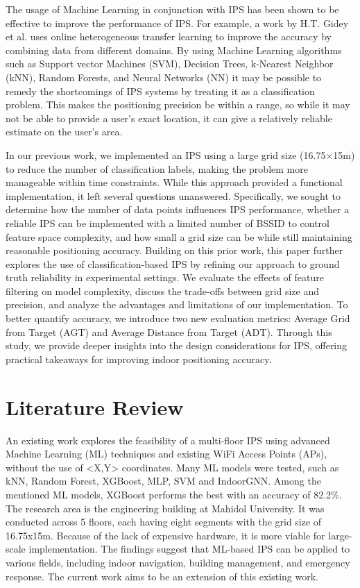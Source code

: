 \documentclass[conference]{IEEEtran}
\begin{document}
	The usage of Machine Learning in conjunction with IPS has been shown to be effective to improve the performance of IPS. For example, a work by H.T. Gidey et al. \cite{bgp3} uses online heterogeneous transfer learning to improve the accuracy by combining data from different domains. By using Machine Learning algorithms such as Support vector Machines (SVM), Decision Trees, k-Nearest Neighbor (kNN), Random Forests, and Neural Networks (NN) it may be possible to remedy the shortcomings of IPS systems by treating it as a classification problem. This makes the positioning precision be within a range, so while it may not be able to provide a user's exact location, it can give a relatively reliable estimate on the user's area.
	
	In our previous work, we implemented an IPS using a large grid size (16.75×15m) to reduce the number of classification labels, making the problem more manageable within time constraints. While this approach provided a functional implementation, it left several questions unanswered. Specifically, we sought to determine how the number of data points influences IPS performance, whether a reliable IPS can be implemented with a limited number of BSSID to control feature space complexity, and how small a grid size can be while still maintaining reasonable positioning accuracy.
	Building on this prior work, this paper further explores the use of classification-based IPS by refining our approach to ground truth reliability in experimental settings. We evaluate the effects of feature filtering on model complexity, discuss the trade-offs between grid size and precision, and analyze the advantages and limitations of our implementation. To better quantify accuracy, we introduce two new evaluation metrics: Average Grid from Target (AGT) and Average Distance from Target (ADT). Through this study, we provide deeper insights into the design considerations for IPS, offering practical takeaways for improving indoor positioning accuracy.
	
	
	\section{Literature Review}
	An existing work \cite{LRE1} explores the feasibility of a multi-floor IPS using advanced Machine Learning (ML) techniques and existing WiFi Access Points (APs), without the use of <X,Y> coordinates. Many ML models were tested, such as kNN, Random Forest, XGBoost, MLP, SVM and IndoorGNN. Among the mentioned ML models, XGBoost performs the best with an accuracy of 82.2\%. The research area is the engineering building at Mahidol University. It was conducted across 5 floors, each having eight segments with the grid size of 16.75x15m. Because of the lack of expensive hardware, it is more viable for large-scale implementation. The findings suggest that ML-based IPS can be applied to various fields, including indoor navigation, building management, and emergency response. The current work aims to be an extension of this existing work.
	
\end{document}
